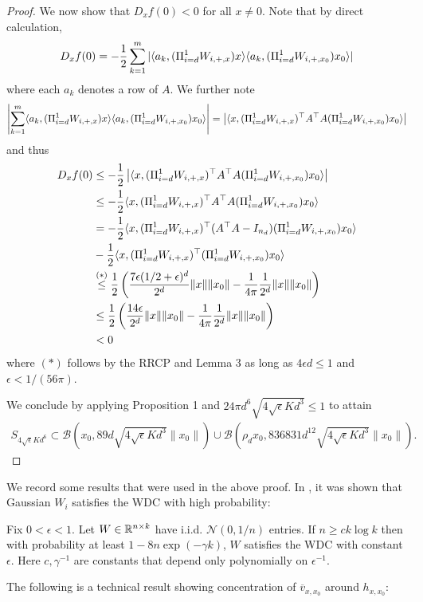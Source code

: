 \documentclass{article}
\begin{document}
\begin{proof}
We now show that $D_{x} f(0) < 0$ for all $x \neq 0$. Note that by direct calculation, \begin{align*}
D_xf(0) = - \frac{1}{2} \sum_{k=1}^m |\langle a_k, (\Pi_{i=d}^1 W_{i,+,x})x\rangle \langle a_k, (\Pi_{i=d}^1 W_{i,+,x_0})x_0 \rangle|
\end{align*} where each $a_k$ denotes a row of $A$. We further note \begin{align*}
\left|\sum_{k=1}^m \langle a_k, (\Pi_{i=d}^1 W_{i,+,x})x\rangle \langle a_k, (\Pi_{i=d}^1 W_{i,+,x_0})x_0 \rangle\right| = \left|\langle x,(\Pi_{i=d}^1 W_{i,+,x})^\top A^\top A (\Pi_{i=d}^1 W_{i,+,x_0})x_0\rangle\right|
\end{align*} and thus \begin{align*}
D_xf(0) & \leq -\frac{1}{2}\left|\langle x,(\Pi_{i=d}^1 W_{i,+,x})^\top A^\top A (\Pi_{i=d}^1 W_{i,+,x_0})x_0\rangle\right|  \\
& \leq - \frac{1}{2} \langle x,(\Pi_{i=d}^1 W_{i,+,x})^\top A^\top A (\Pi_{i=d}^1 W_{i,+,x_0})x_0\rangle \\
& = - \frac{1}{2} \langle x,(\Pi_{i=d}^1 W_{i,+,x})^\top( A^\top A  - I_{n_d})(\Pi_{i=d}^1 W_{i,+,x_0})x_0\rangle \\
& - \frac{1}{2} \langle x,(\Pi_{i=d}^1 W_{i,+,x})^\top (\Pi_{i=d}^1 W_{i,+,x_0})x_0\rangle \\
& \stackrel{(*)}{\leq} \frac{1}{2}\left(\frac{7\epsilon (1/2+ \epsilon)^d}{2^d}\|x\|\|x_0\| - \frac{1}{4\pi} \frac{1}{2^d}\|x\|\|x_0\|\right) \\
& \leq \frac{1}{2}\left(\frac{14\epsilon }{2^d}\|x\|\|x_0\| - \frac{1}{4\pi} \frac{1}{2^d}\|x\|\|x_0\|\right) \\
& < 0
\end{align*} where $(*)$ follows by the RRCP and Lemma 3 as long as $4\epsilon d \leq 1$ and $\epsilon < 1/(56\pi)$.

We conclude by applying Proposition 1 and $24\pi d^6\sqrt{4\sqrt{\epsilon}Kd^3} \leq 1$ to attain \begin{align*}
S_{4\sqrt{\epsilon}Kd^6} \subset \mathcal{B}(x_0,89d\sqrt{4\sqrt{\epsilon}Kd^3}\|x_0\|) \cup \mathcal{B}(\rho_d x_0, 836831d^{12}\sqrt{4\sqrt{\epsilon}Kd^3}\|x_0\|).
\end{align*}
\end{proof}

We record some results that were used in the above proof. In \cite{Hand2017}, it was shown that Gaussian $W_i$ satisfies the WDC with high probability: 

\begin{lem}
Fix $0 < \epsilon < 1$. Let $W \in \mathbb{R}^{n \times k}$ have i.i.d. $\mathcal{N}(0,1/n)$ entries. If $n \geq c k \log k$ then with probability at least $1-8n\exp(-\gamma k)$, $W$ satisfies the WDC with constant $\epsilon$. Here $c,\gamma^{-1}$ are constants that depend only polynomially on $\epsilon^{-1}$.
\end{lem} The following is a technical result showing concentration of $\overline{v}_{x,x_0}$ around $h_{x,x_0}$: 
\end{document}
